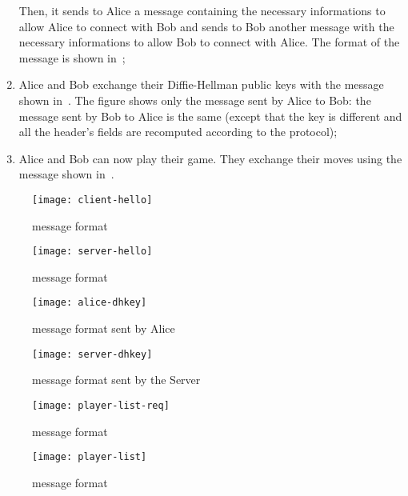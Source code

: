 \begin{enumerate}
		Then, it sends to Alice a  message containing
		the necessary informations to allow Alice to connect with Bob
		and sends to Bob another  message with the
		necessary informations to allow Bob to connect with Alice. The
		format of the  message is shown
		in~;
	\item Alice and Bob exchange their Diffie-Hellman public keys with the
		 message shown in~. The
		figure shows only the message sent by Alice to Bob: the message
		sent by Bob to Alice is the same (except that the key is
		different and all the header's fields are recomputed according
		to the protocol);
	\item Alice and Bob can now play their game. They exchange their moves
		using the  message shown
		in~.
\end{enumerate}

\begin{figure}[htb]
	\texttt{[image: client-hello]}
	\caption{ message format}\label{fig:client-hello}
\end{figure}

\begin{figure}[htb]
	\texttt{[image: server-hello]}
	\caption{ message format}\label{fig:server-hello}
\end{figure}

\begin{figure}[htb]
	\texttt{[image: alice-dhkey]}
	\caption{ message format sent by Alice}\label{fig:alice-dhkey}
\end{figure}

\begin{figure}[htb]
	\texttt{[image: server-dhkey]}
	\caption{ message format sent by the Server}\label{fig:server-dhkey}
\end{figure}

\begin{figure}[htb]
	\texttt{[image: player-list-req]}
	\caption{ message format}\label{fig:player-list-req}
\end{figure}

\begin{figure}[htb]
	\texttt{[image: player-list]}
	\caption{ message format}\label{fig:player-list}
\end{figure}

